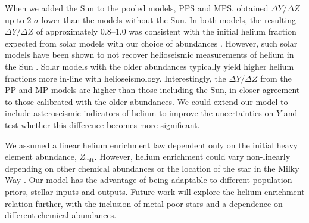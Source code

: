 \documentclass[a4paper,fleqn,usenatbib]{mnras}
\begin{document}
When we added the Sun to the pooled models, PPS and MPS, obtained $\Delta Y / \Delta Z$ up to 2-$\sigma$ lower than the models without the Sun. In both models, the resulting $\Delta Y / \Delta Z$ of approximately \numrange{0.8}{1.0} was consistent with the initial helium fraction expected from solar models with our choice of \citet{Asplund.Grevesse.ea2009} abundances \citep{Serenelli.Basu2010}. However, such solar models have been shown to not recover helioseismic measurements of helium in the Sun \citep{Basu.Antia2004, Serenelli.Basu.ea2009, Villante.Serenelli.ea2014}. Solar models with the older \citet{Grevesse.Sauval1998} abundances typically yield higher helium fractions more in-line with helioseismology. Interestingly, the $\Delta Y / \Delta Z$ from the PP and MP models are higher than those including the Sun, in closer agreement to those calibrated with the older abundances. We could extend our model to include asteroseismic indicators of helium to improve the uncertainties on $Y$ and test whether this difference becomes more significant.


We assumed a linear helium enrichment law dependent only on the initial heavy element abundance, $Z_\mathrm{init}$. However, helium enrichment could vary non-linearly depending on other chemical abundances \citep{West.Heger2013} or the location of the star in the Milky Way \citep{Frebel2010}. Our model has the advantage of being adaptable to different population priors, stellar inputs and outputs. Future work will explore the helium enrichment relation further, with the inclusion of metal-poor stars and a dependence on different chemical abundances.
\end{document}
